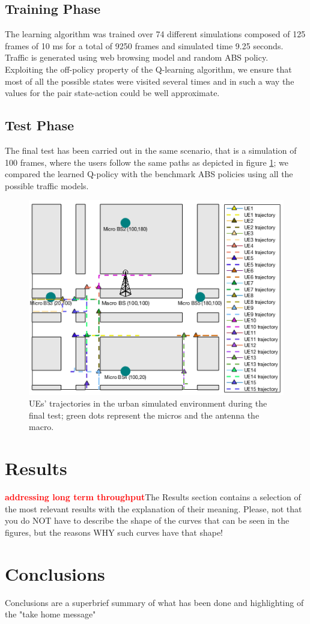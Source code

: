 \documentclass[conference,10pt]{IEEEtran}
\begin{document}
\subsection{Training Phase}
The learning algorithm was trained over 74 different simulations composed of 125 frames of 10 ms for a total of 9250 frames and simulated time 9.25 seconds. Traffic is generated using web browsing model and random ABS policy.
Exploiting the off-policy property of the Q-learning algorithm, we ensure that most of all the possible states were visited several times and in such a way the values for the pair state-action could be well approximate.
\subsection{Test Phase}
The final test has been carried out in the same scenario, that is a simulation of 100 frames, where the users follow the same paths as depicted in figure \ref{img:map}; we compared the learned Q-policy with the benchmark ABS policies using all the possible traffic models.
\begin{figure}[h]
\includegraphics[scale=0.54]{figures/traj.png}
\caption{UEs' trajectories in the urban simulated environment during the final test; green dots represent the micros and the antenna the macro.}\label{img:map} 
\end{figure}
      
\section{Results}\label{sec:res}
\textbf{\textcolor{red}{addressing long term throughput}}The Results section contains a selection of the most relevant results with the explanation of their meaning. Please, not that you do NOT have to describe the shape of the curves that can be seen in the figures, but the reasons WHY such curves have that shape!
\section{Conclusions}\label{sec:conclusion}
Conclusions are a superbrief summary of what has been done and highlighting of the "take home message"
\newpage
\nocite{*}


\end{document}
